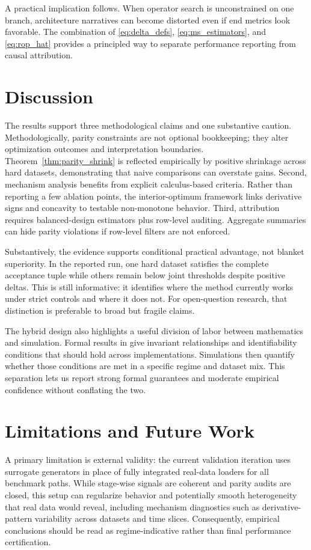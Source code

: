 \documentclass{article} %
\begin{document}
A practical implication follows. When operator search is unconstrained on one branch, architecture narratives can become distorted even if end metrics look favorable. The combination of \eqref{eq:delta_defs}, \eqref{eq:ms_estimators}, and \eqref{eq:rop_hat} provides a principled way to separate performance reporting from causal attribution.

\section{Discussion}
The results support three methodological claims and one substantive caution. Methodologically, parity constraints are not optional bookkeeping; they alter optimization outcomes and interpretation boundaries. Theorem~\ref{thm:parity_shrink} is reflected empirically by positive shrinkage across hard datasets, demonstrating that naive comparisons can overstate gains. Second, mechanism analysis benefits from explicit calculus-based criteria. Rather than reporting a few ablation points, the interior-optimum framework links derivative signs and concavity to testable non-monotone behavior. Third, attribution requires balanced-design estimators plus row-level auditing. Aggregate summaries can hide parity violations if row-level filters are not enforced.

Substantively, the evidence supports conditional practical advantage, not blanket superiority. In the reported run, one hard dataset satisfies the complete acceptance tuple while others remain below joint thresholds despite positive deltas. This is still informative: it identifies where the method currently works under strict controls and where it does not. For open-question research, that distinction is preferable to broad but fragile claims.

The hybrid design also highlights a useful division of labor between mathematics and simulation. Formal results in  give invariant relationships and identifiability conditions that should hold across implementations. Simulations then quantify whether those conditions are met in a specific regime and dataset mix. This separation lets us report strong formal guarantees and moderate empirical confidence without conflating the two.

\section{Limitations and Future Work}
\label{sec:limitations}
A primary limitation is external validity: the current validation iteration uses surrogate generators in place of fully integrated real-data loaders for all benchmark paths. While stage-wise signals are coherent and parity audits are closed, this setup can regularize behavior and potentially smooth heterogeneity that real data would reveal, including mechanism diagnostics such as derivative-pattern variability across datasets and time slices. Consequently, empirical conclusions should be read as regime-indicative rather than final performance certification.
\end{document}
